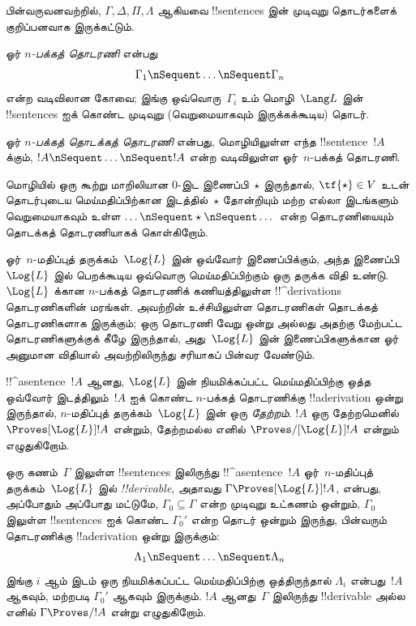 \documentclass[../../../include/open-logic-section]{subfiles}
\begin{document}


பின்வருவனவற்றில், $\Gamma, \Delta, \Pi, \Lambda$ ஆகியவை
!!{sentence}s இன் முடிவுறு தொடர்களைக் குறிப்பனவாக இருக்கட்டும்.

\begin{defn}[பக்கத் தொடரணி]
ஓர் \emph{$n$-பக்கத் தொடரணி} என்பது
\[
\Gamma_1 \nSequent \dots \nSequent \Gamma_n
\]
என்ற வடிவிலான கோவை;
இங்கு ஒவ்வொரு~$\Gamma_i$ உம் மொழி~$\Lang L$ இன் !!{sentence}s ஐக் கொண்ட
முடிவுறு (வெறுமையாகவும் இருக்கக்கூடிய) தொடர்.
\end{defn}

\begin{defn}[தொடக்கத் தொடரணி]
ஓர் \emph{$n$-பக்கத் தொடக்கத் தொடரணி} என்பது, மொழியிலுள்ள எந்த
!!{sentence}~$!A$ க்கும், $!A \nSequent \dots \nSequent !A$ என்ற
வடிவிலுள்ள ஓர்~$n$-பக்கத் தொடரணி.

மொழியில் ஒரு கூற்று மாறிலியான $0$-இட இணைப்பி~$\star$ இருந்தால்,
$\tf{\star} \in V$ உடன் தொடர்புடைய மெய்மதிப்பிற்கான இடத்தில்~$\star$
தோன்றியும் மற்ற எல்லா இடங்களும் வெறுமையாகவும் உள்ள
$\dots \nSequent \star \nSequent \dots$ என்ற தொடரணியையும் தொடக்கத்
தொடரணியாகக் கொள்கிறோம்.
\end{defn}

ஓர்~$n$-மதிப்புத் தருக்கம்~$\Log{L}$ இன் ஒவ்வோர் இணைப்பிக்கும், அந்த
இணைப்பி~$\Log{L}$ இல் பெறக்கூடிய ஒவ்வொரு மெய்மதிப்பிற்கும் ஒரு தருக்க
விதி உண்டு. $\Log{L}$ க்கான $n$-பக்கத் தொடரணிக் கணியத்திலுள்ள
!!^{derivation}s தொடரணிகளின் மரங்கள். அவற்றின் உச்சியிலுள்ள தொடரணிகள்
தொடக்கத் தொடரணிகளாக இருக்கும்; ஒரு தொடரணி வேறு ஒன்று அல்லது அதற்கு மேற்பட்ட
தொடரணிகளுக்குக் கீழே இருந்தால், அது~$\Log{L}$ இன் இணைப்பிகளுக்கான ஓர்
அனுமான விதியால் அவற்றிலிருந்து சரியாகப் பின்வர வேண்டும்.

\begin{defn}[தேற்றங்கள்]
!!^a{sentence}~$!A$ ஆனது, $\Log{L}$ இன் நியமிக்கப்பட்ட மெய்மதிப்பிற்கு
ஒத்த ஒவ்வோர் இடத்திலும்~$!A$ ஐக் கொண்ட $n$-பக்கத் தொடரணிக்கு
!!a{derivation} ஒன்று இருந்தால், $n$-மதிப்புத் தருக்கம்~$\Log{L}$ இன்
ஒரு \emph{தேற்றம்}. $!A$ ஒரு தேற்றமெனில் $\Proves[\Log{L}] !A$ என்றும்,
தேற்றமல்ல எனில் $\Proves/[\Log{L}] !A$ என்றும் எழுதுகிறோம்.
\end{defn}

\begin{defn}[!!^{derivability}]
ஒரு கணம்~$\Gamma$ இலுள்ள !!{sentence}s இலிருந்து !!^a{sentence}~$!A$
ஓர்~$n$-மதிப்புத் தருக்கம்~$\Log{L}$ இல் \emph{!!{derivable}}, அதாவது
$\Gamma \Proves[\Log{L}] !A$, என்பது, அப்போதும் அப்போது மட்டுமே,
$\Gamma_0 \subseteq \Gamma$ என்ற முடிவுறு உட்கணம் ஒன்றும்,
$\Gamma_0$ இலுள்ள !!{sentence}s ஐக் கொண்ட $\Gamma_0'$ என்ற தொடர் ஒன்றும்
இருந்து, பின்வரும் தொடரணிக்கு !!a{derivation} ஒன்று இருக்கும்:
\[ \Lambda_1 \nSequent \dots \nSequent \Lambda_n \]
இங்கு $i$ ஆம் இடம் ஒரு நியமிக்கப்பட்ட மெய்மதிப்பிற்கு ஒத்திருந்தால்
$\Lambda_i$ என்பது~$!A$ ஆகவும், மற்றபடி $\Gamma_0'$ ஆகவும் இருக்கும்.
$!A$ ஆனது~$\Gamma$ இலிருந்து !!{derivable} அல்ல எனில்
$\Gamma \Proves/ !A$ என்று எழுதுகிறோம்.
\end{defn}
\end{document}
